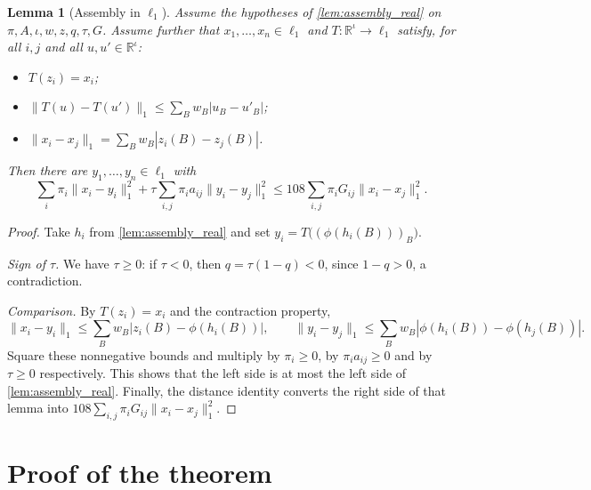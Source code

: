 \documentclass[11pt]{article}
\newtheorem{lemma}[theorem]{Lemma}
\theoremstyle{definition}
\theoremstyle{remark}
\newcommand{\R}{\mathbb{R}}
\begin{document}
\begin{lemma}[Assembly in $\ell_1$]\label{lem:assembly}
Assume the hypotheses of \cref{lem:assembly_real} on $\pi,A,\iota,w,z,q,\tau,G$. Assume further that $x_1,\dots,x_n\in\ell_1$ and $T:\R^\iota\to\ell_1$ satisfy, for all $i,j$ and all $u,u'\in\R^\iota$:
\begin{itemize}
\item $T(z_i)=x_i$;
\item $\|T(u)-T(u')\|_1\le\sum_Bw_B|u_B-u'_B|$;
\item $\|x_i-x_j\|_1=\sum_Bw_B|z_i(B)-z_j(B)|$.
\end{itemize}
Then there are $y_1,\dots,y_n\in\ell_1$ with
\[
\sum_i\pi_i\|x_i-y_i\|_1^2+\tau\sum_{i,j}\pi_ia_{ij}\|y_i-y_j\|_1^2\le108\sum_{i,j}\pi_iG_{ij}\|x_i-x_j\|_1^2 .
\]
\end{lemma}
\begin{proof}
Take $h_i$ from \cref{lem:assembly_real} and set $y_i=T\bigl((\phi(h_i(B)))_B\bigr)$.

\emph{Sign of $\tau$.} We have $\tau\ge0$: if $\tau<0$, then $q=\tau(1-q)<0$, since $1-q>0$, a contradiction.

\emph{Comparison.} By $T(z_i)=x_i$ and the contraction property,
\[
\|x_i-y_i\|_1\le\sum_Bw_B|z_i(B)-\phi(h_i(B))|,\qquad \|y_i-y_j\|_1\le\sum_Bw_B|\phi(h_i(B))-\phi(h_j(B))|.
\]
Square these nonnegative bounds and multiply by $\pi_i\ge0$, by $\pi_ia_{ij}\ge0$ and by $\tau\ge0$ respectively. This shows that the left side is at most the left side of \cref{lem:assembly_real}. Finally, the distance identity converts the right side of that lemma into $108\sum_{i,j}\pi_iG_{ij}\|x_i-x_j\|_1^2$.
\end{proof}

\section{Proof of the theorem}
\end{document}
